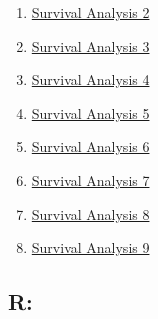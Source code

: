 \documentclass[11pt]{article}
\begin{document}
\begin{multicols}{2}
\begin{enumerate}
		\item \href{https://mp.weixin.qq.com/s/5vzxpwUKPr9Jk3Cef7L-hw}{Survival Analysis 2}	%
		\item \href{https://mp.weixin.qq.com/s/yELMSbwn5dDoV_vqt8onEA}{Survival Analysis 3}	%
		\item \href{https://mp.weixin.qq.com/s/VmUhzuf7SVCLnW-txe97Og}{Survival Analysis 4}	%
		\item \href{https://mp.weixin.qq.com/s/0tqI2rrGhEMZU3AFeHSIfg}{Survival Analysis 5}	%
		\item \href{https://mp.weixin.qq.com/s/nMm_1wfwkX3U_rgBgxFcQg}{Survival Analysis 6}	%
		\item \href{https://mp.weixin.qq.com/s/eptiMLUbVGJ1omD01ePO4w}{Survival Analysis 7}	%
		\item \href{https://mp.weixin.qq.com/s/cSXrLtfS5Gtb2QlvCkokbA}{Survival Analysis 8}	%
		\item \href{https://mp.weixin.qq.com/s/oqb38Zrba-aSSnJd2xvG5g}{Survival Analysis 9}	%
	\end{enumerate}
\end{multicols}

\vspace{-0.5cm}

\subsection*{R:}

\vspace{-0.5cm}
\end{document}
